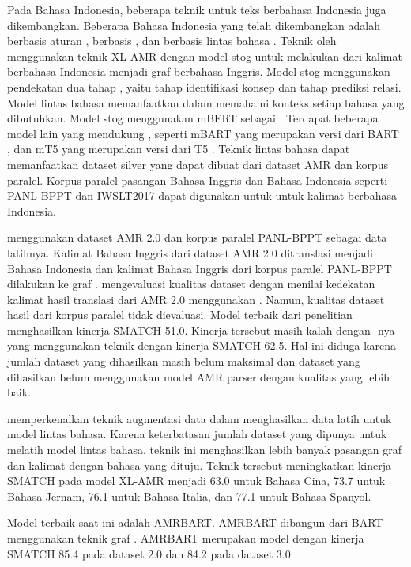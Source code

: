 Pada Bahasa Indonesia, beberapa teknik \amrparsing{} untuk teks berbahasa Indonesia juga dikembangkan.
Beberapa \amrparsing{} Bahasa Indonesia yang telah dikembangkan adalah \amrparsing{} berbasis aturan , berbasis  , dan berbasis lintas bahasa .
Teknik \amrparsing{} oleh \textcite{putra2022} menggunakan teknik  \gls{XL-AMR}  dengan model \gls{stog}  untuk melakukan \amrparsing{} dari kalimat berbahasa Indonesia menjadi graf \AMR{} berbahasa Inggris.
Model \gls{stog} menggunakan pendekatan dua tahap , yaitu tahap identifikasi konsep dan tahap prediksi relasi.
Model \amrparsing{} lintas bahasa memanfaatkan \mwordem{} dalam memahami konteks setiap bahasa yang dibutuhkan.
Model \gls{stog} menggunakan mBERT  sebagai \mwordem{}.
Terdapat beberapa model lain yang mendukung \mwordem{}, seperti mBART  yang merupakan versi \multil{} dari \gls{BART} , dan mT5  yang merupakan versi \multil{} dari T5 .
Teknik \amrparsing{} lintas bahasa dapat memanfaatkan dataset silver yang dapat dibuat dari dataset AMR dan korpus paralel.
Korpus paralel pasangan Bahasa Inggris dan Bahasa Indonesia seperti PANL-BPPT  dan IWSLT2017  dapat digunakan untuk \amrparsing{} untuk kalimat berbahasa Indonesia.

\textcite{putra2022} menggunakan dataset AMR 2.0 dan korpus paralel PANL-BPPT sebagai data latihnya.
Kalimat Bahasa Inggris dari dataset AMR 2.0 ditranslasi menjadi Bahasa Indonesia dan kalimat Bahasa Inggris dari korpus paralel PANL-BPPT dilakukan  ke graf \AMR{}.
\textcite{putra2022} mengevaluasi kualitas dataset dengan menilai kedekatan kalimat hasil translasi dari AMR 2.0 menggunakan \cossim{}.
Namun, kualitas dataset hasil \amrparsing{} dari korpus paralel tidak dievaluasi.
Model terbaik dari penelitian \textcite{putra2022} menghasilkan kinerja SMATCH 51.0.
Kinerja tersebut masih kalah dengan -nya yang menggunakan teknik  dengan kinerja SMATCH 62.5.
Hal ini diduga karena jumlah dataset yang dihasilkan masih belum maksimal dan dataset yang dihasilkan belum menggunakan model AMR parser dengan kualitas yang lebih baik.

\textcite{lee2022} memperkenalkan teknik augmentasi data dalam menghasilkan data latih untuk model \amrparsing{} lintas bahasa.
Karena keterbatasan jumlah dataset yang dipunya untuk melatih model \amrparsing{} lintas bahasa, teknik ini menghasilkan lebih banyak pasangan graf \AMR{} dan kalimat dengan bahasa yang dituju.
Teknik tersebut meningkatkan kinerja SMATCH pada model XL-AMR  menjadi 63.0 untuk Bahasa Cina, 73.7 untuk Bahasa Jernam, 76.1 untuk Bahasa Italia, dan 77.1 untuk Bahasa Spanyol.

Model \amrparsing{} terbaik saat ini adalah \gls{AMRBART}.
\gls{AMRBART} dibangun dari  \gls{BART} menggunakan teknik graf \pretraining{}.
\gls{AMRBART} merupakan model \sota{} dengan kinerja SMATCH 85.4 pada dataset \AMR{} 2.0 dan 84.2 pada dataset \AMR{} 3.0 .
